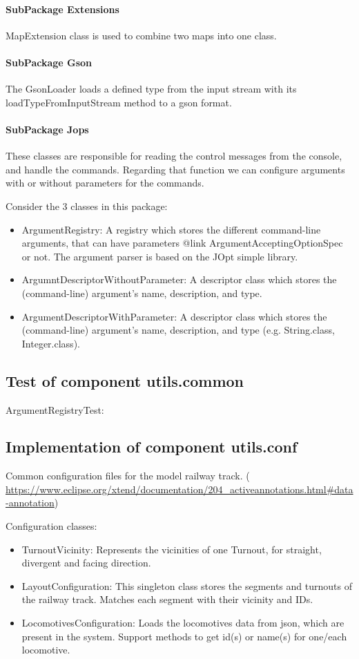 \paragraph{SubPackage Extensions}
MapExtension class is used to combine two maps into one class.

\paragraph{SubPackage Gson} 
The GsonLoader loads a defined type from the input stream with its loadTypeFromInputStream method to a gson format.

\paragraph{SubPackage Jops}
These classes are responsible for reading the control messages from the console, and handle the commands. Regarding that function we can configure arguments with or without parameters for the commands.

Consider the 3 classes in this package:
\begin{itemize}
	\item ArgumentRegistry: A registry which stores the different command-line arguments, that can have parameters {@link ArgumentAcceptingOptionSpec} or not. The argument parser is based on the JOpt simple library.
	\item ArgumntDescriptorWithoutParameter: A descriptor class which stores the (command-line) argument's name, description, and type.
	\item ArgumentDescriptorWithParameter: A descriptor class which stores the (command-line) argument's name, description, and type (e.g. String.class, Integer.class).
\end{itemize}
\subsection{Test of component utils.common}
ArgumentRegistryTest:

\subsection{Implementation of component utils.conf}
Common configuration files for the model railway track.
(\url{ https://www.eclipse.org/xtend/documentation/204\_activeannotations.html#data-annotation})

Configuration classes:
\begin{itemize}
	\item TurnoutVicinity: Represents the vicinities of one Turnout, for straight, divergent and facing direction. 
	\item LayoutConfiguration: This singleton class stores the segments and turnouts of the railway track. Matches each segment with their vicinity and IDs.
	\item LocomotivesConfiguration: Loads the locomotives data from json, which are present in the system. Support methods to get id(s) or name(s) for one/each locomotive.
\end{itemize}

